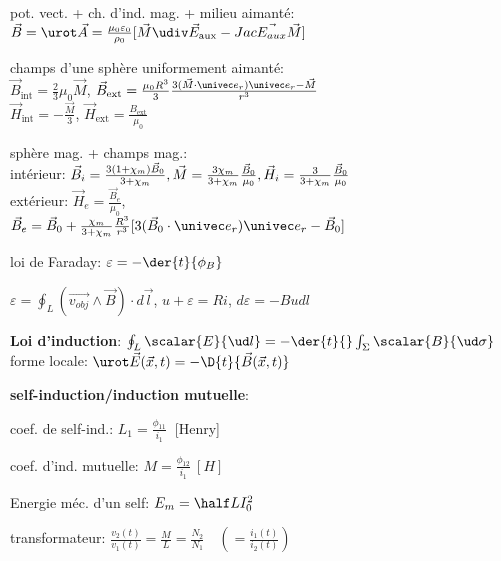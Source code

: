    \item pot. vect. + ch. d'ind. mag. + milieu aimanté: \\
         $\vec B = \urot \vec A = \frac{\mu_0 \varepsilon_0}{\rho_0}
          [\vec M \udiv \vec E_\textrm{aux} - Jac \vec{E_{aux}} \vec{M}]$

   \item champs d'une sphère uniformement aimanté: \\
         $\vec B_\textrm{int} = \frac{2}{3} \mu_0 \vec M$,
         $\vec B_\textrm{ext} = \frac{\mu_0 R^3}{3} \frac{3 (\vec M \cdot \univec e_r) \univec e_r - \vec M}{r^3}$ \\
         $\vec H_\textrm{int} = - \frac{\vec M}{3}$, $\vec H_\textrm{ext} = \frac{B_\textrm{ext}}{\mu_0}$

   \item sphère mag. + champs mag.: \\
         intérieur: $\vec B_i = \frac{3 (1+\chi_m)\vec B_0}{3 + \chi_m}, \\
                \vec M = \frac{3 \chi_m}{3 + \chi_m} \frac{\vec B_0}{\mu_0},
                \vec H_i = \frac{3}{3 + \chi_m} \frac{\vec B_0}{\mu_0}$ \\
         extérieur: $\vec H_e = \frac{\vec B_e}{\mu_0}$, \\
                    $\vec B_e = \vec B_0 + \frac{\chi_m}{3+\chi_m}
                     \frac{R^3}{r^3}
                     [3 (\vec B_0 \cdot \univec e_r) \univec e_r - \vec B_0]$
  \squishend

  \squishlist
   \item loi de Faraday: $\varepsilon = - \der{t}{\phi_B}$
   \item $\varepsilon = \oint_L (\vec{v_{obj}}\wedge\vec{B})\cdot d\vec{l}$, $u+\varepsilon = Ri$, $d\varepsilon = -Budl$
   \item \textbf{Loi d'induction}: $\oint_L \scalar{E}{\ud l}
         = - \der{t}{} \int_\Sigma \scalar{B}{\ud \sigma}$ \\
         forme locale: $\urot \vec E(\vec x,t) = - \D{t}{\vec B(\vec x,t)}$
   \item \textbf{self-induction/induction mutuelle}:
    \squishlist
     \item coef. de self-ind.: $L_1 = \frac{\phi_{11}}{i_1} \ $ [Henry]
     \item coef. d'ind. mutuelle: $M = \frac{\phi_{12}}{i_1} \ [H]$
    \squishend
   \item Energie méc. d'un self: $E_m = \half L I_0^2$
   \item transformateur: $\frac{v_2(t)}{v_1(t)} = \frac{M}{L} = \frac{N_2}{N_1}
         \quad ( = \frac{i_1(t)}{i_2(t)} )$
  \squishend

